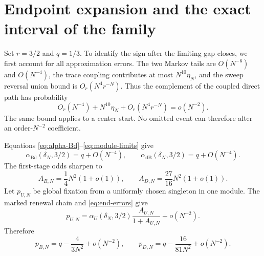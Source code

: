 \documentclass[11pt]{article}
\theoremstyle{definition}
\theoremstyle{remark}
\newcommand{\Bd}{\mathrm{Bd}}
\newcommand{\dB}{\mathrm{dB}}
\begin{document}
\section{Endpoint expansion and the exact interval of the family}

Set $r=3/2$ and $q=1/3$.  To identify the sign after the limiting gap closes,
we first account for all approximation errors.  The two Markov tails are
$O(N^{-6})$ and $O(N^{-4})$, the trace coupling contributes at most
$N^{10}\eta_N$, and the sweep reversal union bound is
$O_r(N^4r^{-N})$.  Thus the complement of the coupled direct path has
probability
\begin{equation}
 O_r(N^{-4})+N^{10}\eta_N+O_r(N^4r^{-N})=o(N^{-2}).
 \label{eq:end-errors}
\end{equation}
The same bound applies to a center start.  No omitted event can therefore
alter an order-$N^{-2}$ coefficient.

Equations \eqref{eq:alpha-Bd}--\eqref{eq:module-limits} give
\begin{equation}
 \alpha_{\Bd}(\delta_N,3/2)=q+O(N^{-4}),\qquad
 \alpha_{\dB}(\delta_N,3/2)=q+O(N^{-4}).
 \label{eq:end-alpha}
\end{equation}
The first-stage odds sharpen to
\begin{equation}
 A_{B,N}=\frac14N^2(1+o(1)),\qquad
 A_{D,N}=\frac{27}{16}N^2(1+o(1)).
 \label{eq:end-odds}
\end{equation}
Let $p_{U,N}$ be global fixation from a uniformly chosen singleton in one
module.  The marked renewal chain and \eqref{eq:end-errors} give
\[
 p_{U,N}=\alpha_U(\delta_N,3/2)
 \frac{A_{U,N}}{1+A_{U,N}}+o(N^{-2}).
\]
Therefore
\begin{equation}
 p_{B,N}=q-\frac{4}{3N^2}+o(N^{-2}),\qquad
 p_{D,N}=q-\frac{16}{81N^2}+o(N^{-2}).
 \label{eq:end-module-start}
\end{equation}
\end{document}
